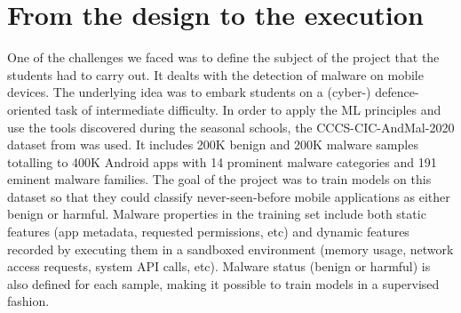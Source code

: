\documentclass[conference]{IEEEtran}
\begin{document}
\section{From the design to the execution}
One of the challenges we faced was to define the subject of the project that the students had to carry out. It dealts with the detection of malware on mobile devices. The underlying idea was to embark students on a (cyber-) defence-oriented task of intermediate difficulty. In order to apply the ML principles and use the tools discovered during the seasonal schools, the CCCS-CIC-AndMal-2020 dataset from \cite{b1,b2,b3} was used. It includes 200K benign and 200K malware samples totalling to 400K Android apps with 14 prominent malware categories and 191 eminent malware families. The goal of the project was to train models on this dataset so that they could classify never-seen-before mobile applications as either benign or harmful. Malware properties in the training set include both static features (app metadata, requested permissions, etc) and dynamic features recorded by executing them in a sandboxed environment (memory usage, network access requests, system API calls, etc). Malware status (benign or harmful) is also defined for each sample, making it possible to train models in a supervised fashion.
\end{document}
